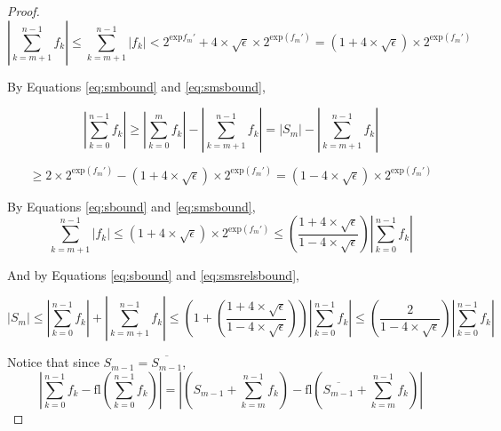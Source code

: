 \documentclass[12pt]{article}
\providecommand{\exp}{\ensuremath{\text{exp}}}
\providecommand{\fl}{\ensuremath{\text{fl}}}
\theoremstyle{plain}
\numberwithin{equation}{section}
\begin{document}
\begin{proof}
      \begin{equation}
        |\sum\limits_{k = m + 1}^{n - 1} f_k| \leq \sum\limits_{k = m + 1}^{n - 1} |f_k| < 2^{\exp{f_m'}} + 4 \times \sqrt\epsilon \times 2^{\exp(f_m')} = (1 + 4 \times \sqrt\epsilon )\times 2^{\exp(f_m')}
        \label{eq:smsbound}
      \end{equation}

      By Equations \ref{eq:smbound} and \ref{eq:smsbound},

      \begin{equation*}
        |\sum\limits_{k = 0}^{n - 1} f_k| \geq |\sum\limits_{k = 0}^{m} f_k| - |\sum\limits_{k = m + 1}^{n - 1} f_k| = |S_m| - |\sum\limits_{k = m + 1}^{n - 1} f_k|
      \end{equation*}

      \begin{equation}
        \geq 2 \times 2^{\exp(f_{m}')} - (1 + 4 \times \sqrt\epsilon)\times 2^{\exp(f_m')} = (1 - 4 \times \sqrt\epsilon)\times 2^{\exp(f_m')}
        \label{eq:sbound}
      \end{equation}

      By Equations \ref{eq:sbound} and \ref{eq:smsbound},
      \begin{equation}
        \sum\limits_{k = m + 1}^{n - 1}|f_k| \leq (1 + 4 \times \sqrt\epsilon)\times2^{\exp(f_m')}\leq (\frac{1 + 4 \times \sqrt\epsilon}{1 - 4 \times \sqrt\epsilon})|\sum\limits_{k = 0}^{n - 1}f_k|
        \label{eq:smsrelsbound}
      \end{equation}

      And by Equations \ref{eq:sbound} and \ref{eq:smsrelsbound},

      \begin{equation}
        |S_m| \leq |\sum\limits_{k = 0}^{n - 1}f_k| + |\sum\limits_{k = m + 1}^{n - 1} f_k| \leq (1 + (\frac{1 + 4 \times \sqrt\epsilon}{1 - 4 \times \sqrt\epsilon}))|\sum\limits_{k = 0}^{n - 1}f_k| \leq (\frac{2}{1 - 4 \times \sqrt\epsilon})|\sum\limits_{k = 0}^{n - 1}f_k|
        \label{eq:smrelsbound}
      \end{equation}

      Notice that since $S_{m - 1} = \overline{S_{m - 1}}$,
      \begin{equation*}
        |\sum \limits_{k = 0}^{n - 1} f_k - \fl(\sum \limits_{k = 0}^{n - 1} f_k)| = |(S_{m - 1} + \sum \limits_{k = m}^{n - 1} f_k) - \fl(\overline{S_{m - 1}} + \sum \limits_{k = m}^{n - 1} f_k)|
      \end{equation*}


\end{proof}
\end{document}
